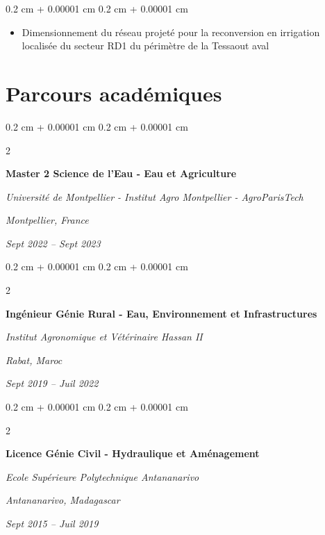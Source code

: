 \documentclass[10pt, letterpaper]{article}
\newenvironment{highlights}{
  \begin{itemize}[
    topsep=0.10 cm,
    parsep=0.10 cm,
    partopsep=0pt,
    itemsep=0pt,
    leftmargin=0.4 cm + 10pt
  ]
}{
  \end{itemize}
} %
\newenvironment{onecolentry}{
  \begin{adjustwidth}{
    0.2 cm + 0.00001 cm
  }{
    0.2 cm + 0.00001 cm
  }
}{
  \end{adjustwidth}
} %
\newenvironment{twocolentry}[2][]{
  \onecolentry
  \def\secondColumn{#2}
  \setcolumnwidth{\fill, 4.6 cm}
  \begin{paracol}{2}
}{
  \switchcolumn \raggedleft \secondColumn
  \end{paracol}
  \endonecolentry
} %
\begin{document}
  \vspace{0.10 cm}

  \begin{onecolentry}
    \begin{highlights}
      \item Dimensionnement du réseau projeté pour la reconversion en irrigation
      localisée du secteur RD1 du périmètre de la Tessaout aval
    \end{highlights}
  \end{onecolentry}

\vspace{0.2 cm}
  

\section{Parcours académiques}

  \begin{twocolentry}
    {
      \textit{Montpellier, France}

      \textit{Sept 2022 – Sept 2023}
    }
    {
      \textbf{Master 2 Science de l'Eau - Eau et Agriculture}

      \textit{Université de Montpellier - Institut Agro Montpellier - AgroParisTech}
    }
  \end{twocolentry}

  \vspace{0.1 cm}

  \begin{twocolentry}
    {
      \textit{Rabat, Maroc}

      \textit{Sept 2019 – Juil 2022}
    }
    {
      \textbf{Ingénieur Génie Rural - Eau, Environnement et Infrastructures}

      \textit{Institut Agronomique et Vétérinaire Hassan II}
    }
  \end{twocolentry}

  \vspace{0.1 cm}

  \begin{twocolentry}
    {
      \textit{Antananarivo, Madagascar}

      \textit{Sept 2015 – Juil 2019}
    }
    {
      \textbf{Licence Génie Civil - Hydraulique et Aménagement}

      \textit{Ecole Supérieure Polytechnique Antananarivo}
    }
  \end{twocolentry}

\vspace{0.2 cm}
\end{document}
